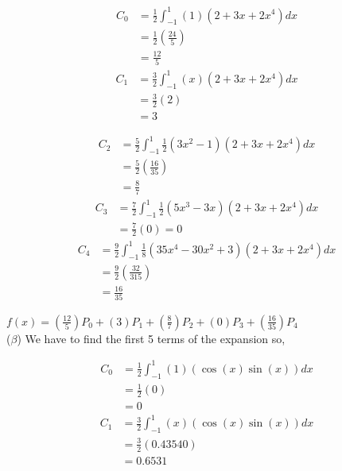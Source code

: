 \documentclass[12pt]{article}
\begin{document}
\begin{multicols}{2}
\begin{align*}
	C_0 &= \frac{1}{2}\int_{-1}^{1}(1)(2+3x+2x^4)dx
\\
	&=\frac{1}{2}\left(\frac{24}{5}\right)
\\
	&=\frac{12}{5}
\end{align*}
\begin{align*}
	C_1&=\frac{3}{2}\int_{-1}^{1}(x)(2+3x+2x^4)dx
\\
	&=\frac{3}{2}(2) \\
	&=3
\end{align*}

\begin{align*}
	C_2&=\frac{5}{2}\int_{-1}^{1}\frac{1}{2}(3x^2-1)(2+3x+2x^4)dx\\&=\frac{5}{2}\left(\frac{16}{35}\right)\\&= \frac{8}{7}
\end{align*}
\begin{align*}
	C_3&=\frac{7}{2}\int_{-1}^{1}\frac{1}{2}(5x^3-3x)(2+3x+2x^4)dx\\&=\frac{7}{2}(0)=0	
\end{align*}
\begin{align*}
	C_4&=\frac{9}{2}\int_{-1}^{1}\frac{1}{8}(35x^4-30x^2+3)(2+3x+2x^4)dx
\\
	&=\frac{9}{2}\left(\frac{32}{315}\right)
\\
	&=\frac{16}{35}
\end{align*}
\end{multicols}
$\displaystyle f(x)=\left(\frac{12}{5}\right) P_0+(3)P_1+\left(\frac{8}{7}\right)P_2+(0)P_3+\left(\frac{16}{35}\right)P_4$
\\
($\beta$) We have to find the first 5 terms of the expansion so,
\begin{multicols}{2}
\begin{align*}
	C_0 &= \frac{1}{2}\int_{-1}^{1}(1)(\cos(x)\sin(x))dx
\\
	&=\frac{1}{2}(0)
\\
	&=0
\end{align*}
\begin{align*}
	C_1&=\frac{3}{2}\int_{-1}^{1}(x)(\cos(x)\sin(x))dx
\\
	&=\frac{3}{2}(0.43540)
\\
	&=0.6531
\end{align*}
\end{multicols}
\end{document}
